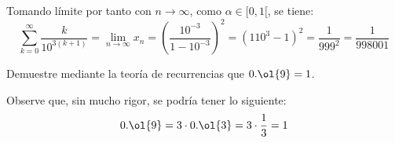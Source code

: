\begin{ejercicio}
    Tomando límite por tanto con $n\to \infty$, como $\alpha\in [0,1[$, se tiene:
    \begin{equation*}
        \sum_{k=0}^{\infty} \dfrac{k}{10^{3(k+1)}} = \lim_{n\to \infty} x_n
        = \left(\dfrac{10^{-3}}{1-10^{-3}}\right)^2
        = \left({1}{10^3-1}\right)^2
        = \dfrac{1}{999^2} = \dfrac{1}{998001}
    \end{equation*}

\end{ejercicio}



\begin{ejercicio}
    Demuestre mediante la teoría de recurrencias que $0.\ol{9}=1$.
    \begin{observacion}
        Observe que, sin mucho rigor, se podría tener lo siguiente:
        \begin{equation*}
            0.\ol{9} = 3\cdot 0.\ol{3} = 3\cdot \dfrac{1}{3} = 1
        \end{equation*}
    \end{observacion}
\end{ejercicio}


